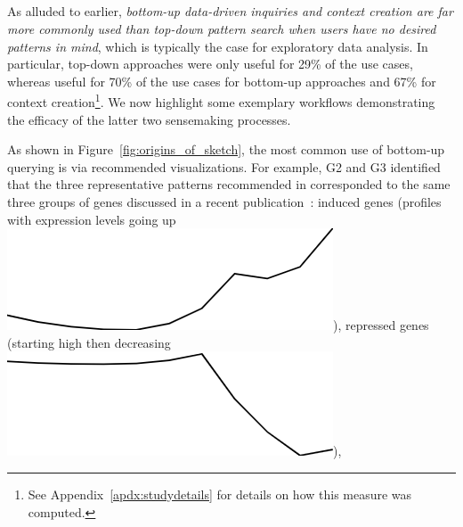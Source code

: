  \subsection{}%
 \par As alluded to earlier,
 \emph{bottom-up data-driven inquiries
 and context creation are far more commonly
 used than top-down pattern search
 when users have no desired patterns in mind},
 which is typically the case for exploratory data analysis.
 In particular, top-down approaches were only useful for 29\% of the use cases,
 whereas  useful for 70\% of the use cases
 for bottom-up approaches and 67\%
 for context creation\footnote{See Appendix~\ref{apdx:studydetails} for details on how this measure was computed.}. We now highlight some exemplary workflows demonstrating the efficacy of the latter two sensemaking processes.
 \par As shown in Figure~\ref{fig:origins_of_sketch},
 the most common use of bottom-up querying
 is via recommended visualizations. For example, G2 and G3 identified that
 the three representative patterns
 recommended in \zvpp corresponded
 to the same three groups of genes discussed
 in a recent publication~\cite{Gloss2017}:
 induced genes (profiles with expression levels going up \includegraphics[width=2\baselineskip,keepaspectratio]{figures/induced.png}),
 repressed genes (starting high then decreasing \includegraphics[width=2\baselineskip,keepaspectratio]{figures/repressed.png}),
